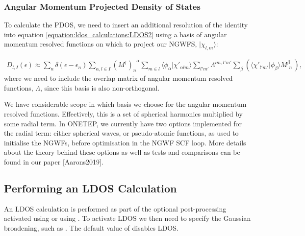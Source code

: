 \documentclass[letterpaper,10pt,english]{sphinxmanual}
\begin{document}
\subsubsection{Angular Momentum Projected Density of States}
\label{\detokenize{ldos_calculations:angular-momentum-projected-density-of-states}}
To calculate the PDOS, we need to insert an additional resolution of the
identity into equation \eqref{equation:ldos_calculations:LDOS2} using a basis of angular momentum
resolved functions on which to project our NGWFS,
\(| \chi_{l,m}\rangle\):

\label{\detokenize{ldos_calculations:equation-dos-identity-operator}}\begin{equation}\label{equation:ldos_calculations:DOS_identity_operator}
\begin{split}D_{l,I}(\epsilon) \approx \sum_n  \delta(\epsilon-\epsilon_n) \sum_{\alpha,l\in I}(M^{\dagger})_n^{\,\,\,\,\alpha} \sum_{m \in l}\langle{\phi_\alpha
| \chi'_{\alpha l m}}\rangle \sum_{l'm'} \Lambda^{ l m, l'm'} \sum_\beta \left(\langle{ \chi'_{
l' m'} |\phi_\beta}\rangle M^\beta_{\ \, n}   \, \right),\end{split}
\end{equation}
where we need to include the overlap matrix of angular momentum
resolved functions, \(\Lambda\), since this basis is also
non-orthogonal.

We have considerable scope in which basis we choose for the angular
momentum resolved functions. Effectively, this is a set of spherical
harmonics multiplied by some radial term. In ONETEP, we currently have
two options implemented for the radial term: either spherical waves, or
pseudo-atomic functions, as used to initialise the NGWFs, before
optimisation in the NGWF SCF loop. More details about the theory behind
these options as well as tests and comparisons can be found in our paper
{[}Aarons2019{]}.


\subsection{Performing an LDOS Calculation}
\label{\detokenize{ldos_calculations:performing-an-ldos-calculation}}
An LDOS calculation is performed as part of the optional post-processing
activated using  or using .
To activate LDOS we then need to specify the Gaussian broadening, such
as . The default value of
 disables LDOS.
\end{document}
